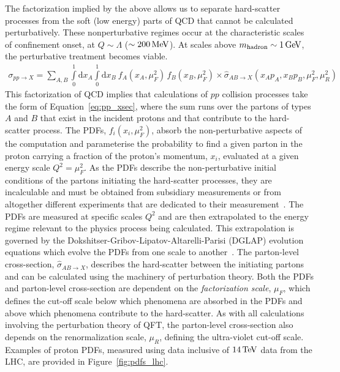 The factorization implied by the above allows us to separate hard-scatter processes from the soft (low energy) parts
of QCD that cannot be calculated perturbatively.
These nonperturbative regimes occur at the characteristic scales of confinement onset, at $Q \sim \Lambda$ ($\sim 200\,\text{Me\kern -0.1em V}$).
At scales above $m_{\text{hadron}} \sim 1\,\text{Ge\kern -0.1em V}$, the perturbative treatment becomes viable.
\begin{align}
    \sigma_{pp \rightarrow X} = \sum\limits_{A,B} \int\limits_0^1 \mathrm{d}x_A \int\limits_0^1 \mathrm{d}x_B \: f_{A}(x_A, \mu_F^2) \, f_{B}(x_B, \mu_F^2) \times \hat{\sigma}_{AB \rightarrow X}(x_A p_A, x_B p_B, \mu_F^2, \mu_R^2)
    \label{eq:pp_xsec}
\end{align}
This factorization of QCD implies that calculations of $pp$ collision processes take the form of Equation~\ref{eq:pp_xsec},
where the sum runs over the partons of types $A$ and $B$ that exist in the incident protons and that contribute to the hard-scatter process.
The PDFs, $f_{i}(x_i, \mu_F^2)$, absorb the non-perturbative aspects of the computation and parameterise the probability
to find a given parton in the proton carrying a fraction of the proton's momentum, $x_i$, evaluated at a given energy scale
$Q^2 = \mu_F^2$.
As the PDFs describe the non-perturbative initial conditions of the partons initiating the hard-scatter processes,
they are incalculable and must be obtained from subsidiary measurements or from altogether
different experiments that are dedicated to their measurement~\cite{Placakyte:2011az,Ball:2012cx}.
The PDFs are measured at specific scales $Q^2$ and are then extrapolated to the energy regime relevant to the physics process
being calculated.
This extrapolation is governed by the Dokshitser-Gribov-Lipatov-Altarelli-Parisi (DGLAP)
evolution equations which evolve the PDFs from one scale to another~\cite{Altarelli:1977zs,Gribov:1972ri,Dokshitzer:1977sg}.
The parton-level cross-section, $\hat{\sigma}_{AB \rightarrow X}$, describes the hard-scatter between the initiating partons
and can be calculated using the machinery of perturbation theory.
Both the PDFs and parton-level cross-section are dependent on the \textit{factorization scale}, $\mu_F$,
which defines the cut-off scale below which phenomena are absorbed in the PDFs and above which phenomena contribute to the
hard-scatter. 
As with all calculations involving the perturbation theory of QFT, the parton-level cross-section also depends on the
renormalization scale, $\mu_R$, defining the ultra-violet cut-off scale.
Examples of proton PDFs, measured using data inclusive of $14\,\text{Te\kern -0.1em V}$ data from the LHC, are provided in Figure~\ref{fig:pdfs_lhc}.

